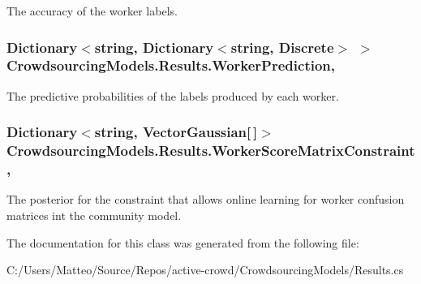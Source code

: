 The accuracy of the worker labels. 

\hypertarget{class_crowdsourcing_models_1_1_results_ade5b969fe6b048391a8da32cc1f9a113}{}
\subsubsection[{Worker\+Prediction}]{\setlength{\rightskip}{0pt plus 5cm}Dictionary$<$string, Dictionary$<$string, Discrete$>$ $>$ Crowdsourcing\+Models.\+Results.\+Worker\+Prediction\hspace{0.3cm}{\ttfamily [get]}, {}}\label{class_crowdsourcing_models_1_1_results_ade5b969fe6b048391a8da32cc1f9a113}


The predictive probabilities of the labels produced by each worker. 

\hypertarget{class_crowdsourcing_models_1_1_results_acf297b7ce2319208a4875c77ca6aa535}{}
\subsubsection[{Worker\+Score\+Matrix\+Constraint}]{\setlength{\rightskip}{0pt plus 5cm}Dictionary$<$string, Vector\+Gaussian\mbox{[}$\,$\mbox{]}$>$ Crowdsourcing\+Models.\+Results.\+Worker\+Score\+Matrix\+Constraint\hspace{0.3cm}{\ttfamily [get]}, {}}\label{class_crowdsourcing_models_1_1_results_acf297b7ce2319208a4875c77ca6aa535}


The posterior for the constraint that allows online learning for worker confusion matrices int the community model. 



The documentation for this class was generated from the following file\+:\begin{DoxyCompactItemize}
\item 
C\+:/\+Users/\+Matteo/\+Source/\+Repos/active-\/crowd/\+Crowdsourcing\+Models/Results.\+cs\end{DoxyCompactItemize}
